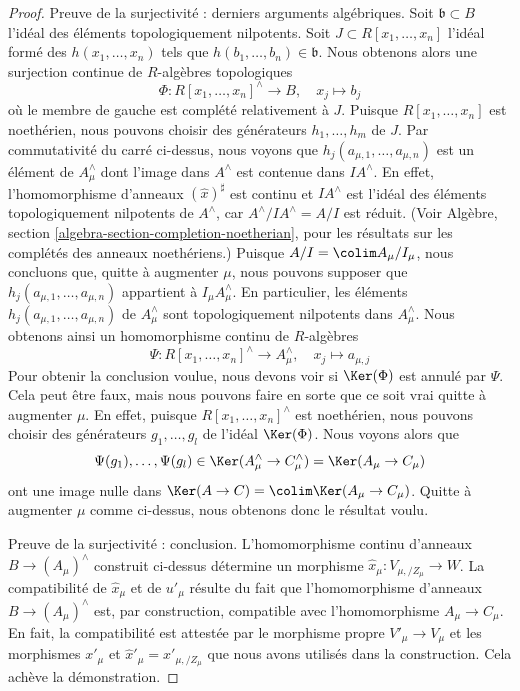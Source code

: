 \begin{proof}
\medskip\noindent
Preuve de la surjectivité : derniers arguments algébriques.
Soit $\mathfrak b \subset B$ l'idéal des éléments topologiquement
nilpotents. Soit $J \subset R[x_1, \ldots, x_n]$ l'idéal
formé des $h(x_1, \ldots, x_n)$ tels que
$h(b_1, \ldots, b_n) \in \mathfrak b$. Nous obtenons alors une surjection
continue de $R$-algèbres topologiques
$$
\Phi : R[x_1, \ldots, x_n]^\wedge \longrightarrow B,\quad
x_j \longmapsto b_j
$$
où le membre de gauche est complété relativement à $J$.
Puisque $R[x_1, \ldots, x_n]$ est noethérien, nous pouvons choisir
des générateurs $h_1, \ldots, h_m$ de $J$. Par commutativité
du carré ci-dessus, nous voyons que $h_j(a_{\mu, 1}, \ldots, a_{\mu, n})$ est
un élément de $A_\mu^\wedge$ dont l'image dans $A^\wedge$ est contenue
dans $IA^\wedge$. En effet, l'homomorphisme d'anneaux $(\hat x)^\sharp$ est continu
et $IA^\wedge$ est l'idéal des éléments topologiquement nilpotents
de $A^\wedge$, car $A^\wedge/IA^\wedge = A/I$ est réduit.
(Voir Algèbre, section \ref{algebra-section-completion-noetherian},
pour les résultats sur les complétés des anneaux noethériens.)
Puisque $A/I = \colim A_\mu/I_\mu$, nous concluons que, quitte à augmenter
$\mu$, nous pouvons supposer que $h_j(a_{\mu, 1}, \ldots, a_{\mu, n})$ appartient à
$I_\mu A_\mu^\wedge$. En particulier, les éléments
$h_j(a_{\mu, 1}, \ldots, a_{\mu, n})$ de $A_\mu^\wedge$
sont topologiquement nilpotents dans $A_\mu^\wedge$.
Nous obtenons ainsi un homomorphisme continu de $R$-algèbres
$$
\Psi : R[x_1, \ldots, x_n]^\wedge \longrightarrow A_\mu^\wedge,\quad
x_j \longmapsto a_{\mu, j}
$$
Pour obtenir la conclusion voulue, nous devons voir si $\Ker(\Phi)$ est
annulé par $\Psi$. Cela peut être faux, mais nous pouvons faire en sorte
que ce soit vrai quitte à augmenter $\mu$. En effet, puisque
$R[x_1, \ldots, x_n]^\wedge$ est noethérien,
nous pouvons choisir des générateurs $g_1, \ldots, g_l$ de l'idéal
$\Ker(\Phi)$. Nous voyons alors que
$$
\Psi(g_1), \ldots, \Psi(g_l) \in
\Ker(A_\mu^\wedge \to C_\mu^\wedge) = \Ker(A_\mu \to C_\mu)
$$
ont une image nulle dans $\Ker(A \to C) = \colim \Ker(A_\mu \to C_\mu)$.
Quitte à augmenter $\mu$ comme ci-dessus, nous obtenons donc le résultat voulu.

\medskip\noindent
Preuve de la surjectivité : conclusion. L'homomorphisme continu d'anneaux
$B \to (A_\mu)^\wedge$ construit ci-dessus détermine un morphisme
$\hat x_\mu : V_{\mu, /Z_\mu} \to W$.
La compatibilité de $\hat x_\mu$ et de $u'_\mu$ résulte
du fait que l'homomorphisme d'anneaux $B \to (A_\mu)^\wedge$
est, par construction, compatible avec l'homomorphisme $A_\mu \to C_\mu$.
En fait, la compatibilité est attestée par le morphisme propre
$V'_\mu \to V_\mu$ et les morphismes
$x'_\mu$ et $\hat x'_\mu = x'_{\mu, /Z_\mu}$ que nous avons utilisés dans
la construction. Cela achève la démonstration.
\end{proof}

